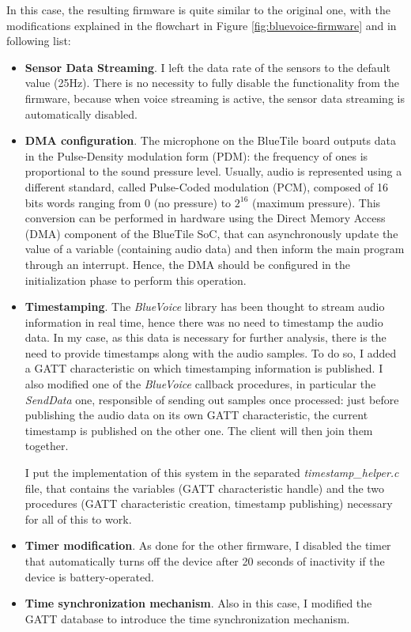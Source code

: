  In this case, the resulting firmware is quite similar to the original one, with the modifications explained in the flowchart in Figure \ref{fig:bluevoice-firmware} and in following list:
 \begin{itemize}
     \item \textbf{Sensor Data Streaming}. I left the data rate of the sensors to the default value (25Hz). There is no necessity to fully disable the functionality from the firmware, because when voice streaming is active, the sensor data streaming is automatically disabled.
     \item \textbf{DMA configuration}. The microphone on the BlueTile board outputs data in the Pulse-Density modulation form (PDM): the frequency of ones is proportional to the sound pressure level. Usually, audio is represented using a different standard, called Pulse-Coded modulation (PCM), composed of 16 bits words ranging from 0 (no pressure) to \(2^{16}\) (maximum pressure). This conversion can be performed in hardware using the Direct Memory Access (DMA) component of the BlueTile SoC, that can asynchronously update the value of a variable (containing audio data) and then inform the main program through an interrupt. Hence, the DMA should be configured in the initialization phase to perform this operation.  
     \item \textbf{Timestamping}. The \textit{BlueVoice} library has been thought to stream audio information in real time, hence there was no need to timestamp the audio data. In my case, as this data is necessary for further analysis, there is the need to provide timestamps along with the audio samples. To do so, I added a GATT characteristic on which timestamping information is published. I also modified one of the \textit{BlueVoice} callback procedures, in particular the \textit{SendData} one, responsible of sending out samples once processed: just before publishing the audio data on its own GATT characteristic, the current timestamp is published on the other one. The client will then join them together.

     I put the implementation of this system in the separated \textit{timestamp\_helper.c} file, that contains the variables (GATT characteristic handle) and the two procedures (GATT characteristic creation, timestamp publishing) necessary for all of this to work.
    \item \textbf{Timer modification}. As done for the other firmware, I disabled the timer that automatically turns off the device after 20 seconds of inactivity if the device is battery-operated.
    \item \textbf{Time synchronization mechanism}. Also in this case, I modified the GATT database to introduce the time synchronization mechanism.
 \end{itemize}
 


